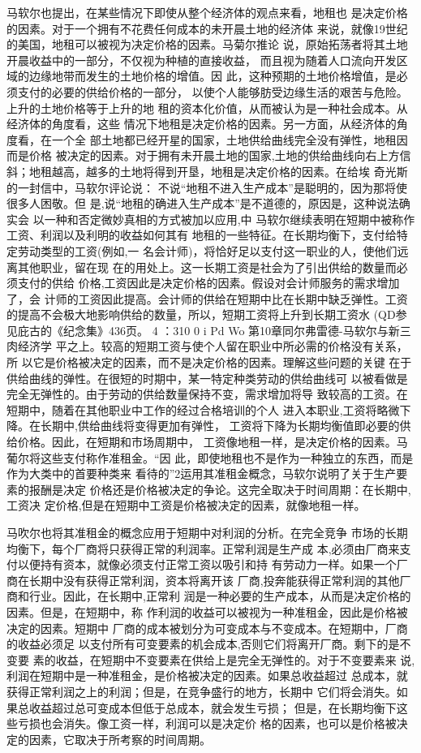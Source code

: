 马软尔也提出，在某些情况下即使从整个经济体的观点来看，地租也
是决定价格的因素。对于一个拥有不花费任何成本的未开晨土地的经济体
来说，就像19世纪的美国，地租可以被视为决定价格的因素。马菊尔推论
说，原始拓荡者将其土地开晨收益中的一部分，不仅视为种植的直接收益，
而且视为随着人口流向开发区域的边缘地带而发生的土地价格的增值。因
此，这种预期的土地价格增值，是必须支付的必要的供给价格的一部分，
以使个人能够肪受边缘生活的艰苦与危险。上升的土地价格等于上升的地
租的资本化价值，从而被认为是一种社会成本。从经济体的角度看，这些
情况下地租是决定价格的因素。另一方面，从经济体的角度看，在一个全
部土地都已经开星的国家，土地供给曲线完全没有弹性，地租因而是价格
被决定的因素。对于拥有未开晨土地的国家,土地的供给曲线向右上方信
斜；地租越高，越多的土地将得到开垦，地租是决定价格的因素。在给埃
奇光斯的一封信中，马软尔评论说：
不说“地租不进入生产成本”是聪明的，因为那将使很多人困敬。但
是,说“地租的确进入生产成本”是不道德的，原因是，这种说法确实会
以一种和否定微妙真相的方式被加以应用,中
马软尔继续表明在短期中被称作工资、利润以及利明的收益如何其有
地租的一些特征。在长期均衡下，支付给特定劳动类型的工资(例如,一
名会计师)，将恰好足以支付这一职业的人，使他们远离其他职业，留在现
在的用处上。这一长期工资是社会为了引出供给的数量而必须支付的供给
价格,工资因此是决定价格的因素。假设对会计师服务的需求增加了，会
计师的工资因此提高。会计师的供给在短期中比在长期中缺乏弹性。工资
的提高不会极大地影响供给的数量，所以，短期工资将上升到长期工资水
(QD参见庇古的《纪念集》436页。
4
：310
0
i
Pd
Wo
第10章同尔弗雷德-马软尔与新三肉经济学
平之上。较高的短期工资与使个人留在职业中所必需的价格没有关系，所
以它是价格被决定的因素，而不是决定价格的因素。理解这些问题的关键
在于供给曲线的弹性。在很短的时期中，某一特定种类劳动的供给曲线可
以被看做是完全无弹性的。由于劳动的供给数量保持不变，需求增加将导
致较高的工资。在短期中，随着在其他职业中工作的经过合格培训的个人
进入本职业,工资将略微下降。在长期中,供给曲线将变得更加有弹性，
工资将下降为长期均衡值即必要的供给价格。因此，在短期和市场周期中，
工资像地租一样，是决定价格的因素。马葡尔将这些支付称作准租金。“因
此，即使地租也不是作为一种独立的东西，而是作为大类中的首要种类来
看待的”2运用其准租金概念，马软尔说明了关于生产要素的报酬是决定
价格还是价格被决定的争论。这完全取决于时间周期：在长期中,工资决
定价格,但是在短期中工资是价格被决定的因素，就像地租一样。

马吹尔也将其准租金的概念应用于短期中对利润的分析。在完全竞争
市场的长期均衡下，每个厂商将只获得正常的利润率。正常利润是生产成
本,必须由厂商来支付以便持有资本，就像必须支付正常工资以吸引和持
有劳动力一样。如果一个厂商在长期中没有获得正常利润，资本将离开该
厂商,投奔能获得正常利润的其他厂商和行业。因此，在长期中,正常利
润是一种必要的生产成本，从而是决定价格的因素。但是，在短期中，称
作利润的收益可以被视为一种准租金，因此是价格被决定的因素。短期中
厂商的成本被划分为可变成本与不变成本。在短期中，厂商的收益必须足
以支付所有可变要素的机会成本,否则它们将离开厂商。剩下的是不变要
素的收益，在短期中不变要素在供给上是完全无弹性的。对于不变要素来
说,利润在短期中是一种准租金，是价格被决定的因素。如果总收益超过
总成本，就获得正常利润之上的利润；但是，在竞争盛行的地方，长期中
它们将会消失。如果总收益超过总可变成本但低于总成本，就会发生亏损；
但是，在长期均衡下这些亏损也会消失。像工资一样，利润可以是决定价
格的因素，也可以是价格被决定的因素，它取决于所考察的时间周期。


